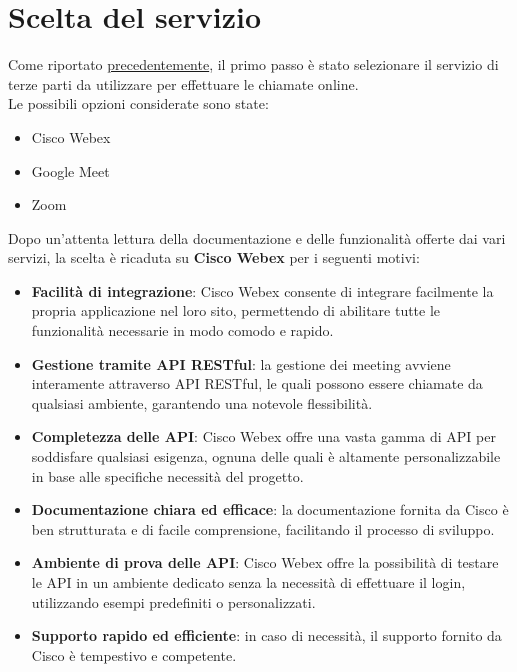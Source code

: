 \section{Scelta del servizio}
Come riportato \hyperref[sec:scelta_del_servizo]{precedentemente}, il primo passo è stato selezionare il 
servizio di terze parti da utilizzare per effettuare le chiamate online.
\\
Le possibili opzioni considerate sono state:
\begin{itemize}
    \item Cisco Webex
    \item Google Meet
    \item Zoom
\end{itemize}
Dopo un'attenta lettura della documentazione e delle funzionalità offerte dai vari servizi,
la scelta è ricaduta su \textbf{Cisco Webex} per i seguenti motivi:
\begin{itemize}

    \item \textbf{Facilità di integrazione}: Cisco Webex consente di integrare facilmente la propria applicazione nel loro sito, 
    permettendo di abilitare tutte le funzionalità necessarie in modo comodo e rapido.

    \item \textbf{Gestione tramite API RESTful}: la gestione dei meeting avviene interamente attraverso API RESTful, 
    le quali possono essere chiamate da qualsiasi ambiente, garantendo una notevole flessibilità.

    \item \textbf{Completezza delle API}: Cisco Webex offre una vasta gamma di API per soddisfare qualsiasi esigenza, 
    ognuna delle quali è altamente personalizzabile in base alle specifiche necessità del progetto.

    \item \textbf{Documentazione chiara ed efficace}: la documentazione fornita da Cisco è ben strutturata e di facile comprensione, facilitando il processo di sviluppo.
    
    \item \textbf{Ambiente di prova delle API}: Cisco Webex offre la possibilità di testare le API in un ambiente dedicato senza la necessità di effettuare il login, utilizzando esempi predefiniti o personalizzati.

    \item \textbf{Supporto rapido ed efficiente}: in caso di necessità, il supporto fornito da Cisco è tempestivo e competente.
\end{itemize}